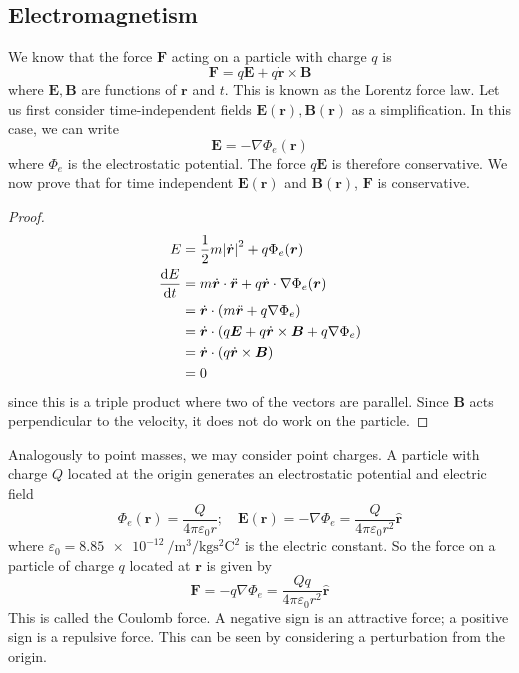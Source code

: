 \documentclass{article}
\begin{document}
\subsection{Electromagnetism}
We know that the force $\bm F$ acting on a particle with charge $q$ is
\[ \bm F = q\bm E + q\dot{\bm r} \times \bm B \]
where $\bm E, \bm B$ are functions of $\bm r$ and $t$. This is known as the Lorentz force law. Let us first consider time-independent fields $\bm E(\bm r), \bm B(\bm r)$ as a simplification. In this case, we can write
\[ \bm E = -\nabla \Phi_e(\bm r) \]
where $\Phi_e$ is the electrostatic potential. The force $q\bm E$ is therefore conservative. We now prove that for time independent $\bm E(\bm r)$ and $\bm B(\bm r)$, $\bm F$ is conservative.
\begin{proof}
    \begin{align*}
        E                   & = \frac{1}{2}m \abs{\dot{\bm r}}^2 + q\Phi_e(\bm r)                          \\
        \frac{\dd E}{\dd t} & = m \dot{\bm r} \cdot \ddot{\bm r} + q\dot{\bm r} \cdot \nabla \Phi_e(\bm r) \\
                            & = \dot{\bm r} \cdot (m \ddot{\bm r} + q\nabla \Phi_e)                        \\
                            & = \dot{\bm r} \cdot (q \bm E + q \dot{\bm r} \times \bm B + q \nabla \Phi_e) \\
                            & = \dot{\bm r} \cdot (q \dot{\bm r} \times \bm B)                             \\
                            & = 0
    \end{align*}
    since this is a triple product where two of the vectors are parallel. Since $\bm B$ acts perpendicular to the velocity, it does not do work on the particle.
\end{proof}
\noindent Analogously to point masses, we may consider point charges. A particle with charge $Q$ located at the origin generates an electrostatic potential and electric field
\[ \Phi_e(\bm r) = \frac{Q}{4\pi\varepsilon_0 r};\quad \bm E(\bm r) = -\nabla \Phi_e = \frac{Q}{4\pi\varepsilon_0 r^2}\hat{\bm r} \]
where $\varepsilon_0 = \SI{8.85e-12}{\per\metre\cubed\per\kilogram\second\squared\coulomb\squared}$ is the electric constant. So the force on a particle of charge $q$ located at $\bm r$ is given by
\[ \bm F = -q\nabla \Phi_e = \frac{Qq}{4\pi\varepsilon_0 r^2}\hat{\bm r} \]
This is called the Coulomb force. A negative sign is an attractive force; a positive sign is a repulsive force. This can be seen by considering a perturbation from the origin.
\end{document}
